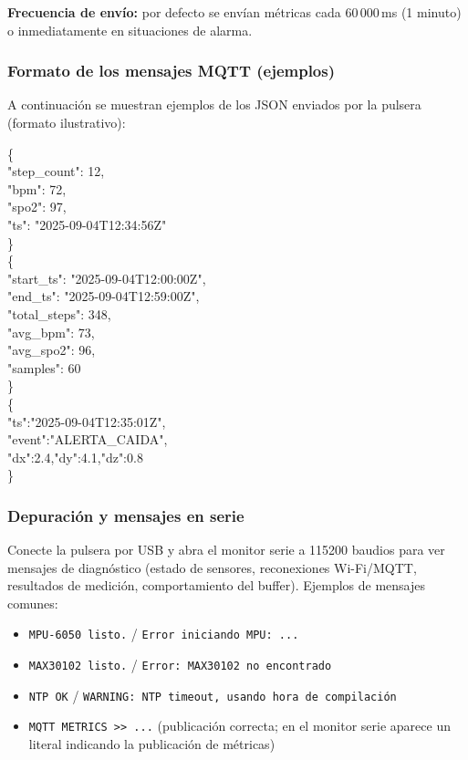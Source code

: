 \documentclass[12pt, a4paper]{article}
\begin{document}
\begin{umaappendices}
	\noindent\textbf{Frecuencia de envío:} por defecto se envían métricas cada 60\,000\,ms (1 minuto) o inmediatamente en situaciones de alarma.
	
	\subsubsection{Formato de los mensajes MQTT (ejemplos)}
	A continuación se muestran ejemplos de los JSON enviados por la pulsera (formato ilustrativo):
	
	\bigskip
	{\ttfamily\small
		\noindent
		\{\\
		\quad "step\_count": 12,\\
		\quad "bpm": 72,\\
		\quad "spo2": 97,\\
		\quad "ts": "2025-09-04T12:34:56Z"\\
		\}\\[6pt]
		
		\noindent
		\{\\
		\quad "start\_ts": "2025-09-04T12:00:00Z",\\
		\quad "end\_ts": "2025-09-04T12:59:00Z",\\
		\quad "total\_steps": 348,\\
		\quad "avg\_bpm": 73,\\
		\quad "avg\_spo2": 96,\\
		\quad "samples": 60\\
		\}\\[6pt]
		
		\noindent
		\{\\
		\quad "ts":"2025-09-04T12:35:01Z",\\
		\quad "event":"ALERTA\_CAIDA",\\
		\quad "dx":2.4,"dy":4.1,"dz":0.8\\
		\}
	}
	\bigskip
	

	\subsubsection{Depuración y mensajes en serie}
	Conecte la pulsera por USB y abra el monitor serie a 115200 baudios para ver mensajes de diagnóstico (estado de sensores, reconexiones Wi-Fi/MQTT, resultados de medición, comportamiento del buffer). Ejemplos de mensajes comunes:
	
	\begin{itemize}
		\item \texttt{MPU-6050 listo.} / \texttt{Error iniciando MPU: ...}
		\item \texttt{MAX30102 listo.} / \texttt{Error: MAX30102 no encontrado}
		\item \texttt{NTP OK} / \texttt{WARNING: NTP timeout, usando hora de compilación}
		\item \texttt{MQTT METRICS \textgreater\textgreater\ ...} (publicación correcta; en el monitor serie aparece un literal indicando la publicación de métricas)
	\end{itemize}
	


\end{umaappendices}
\end{document}
